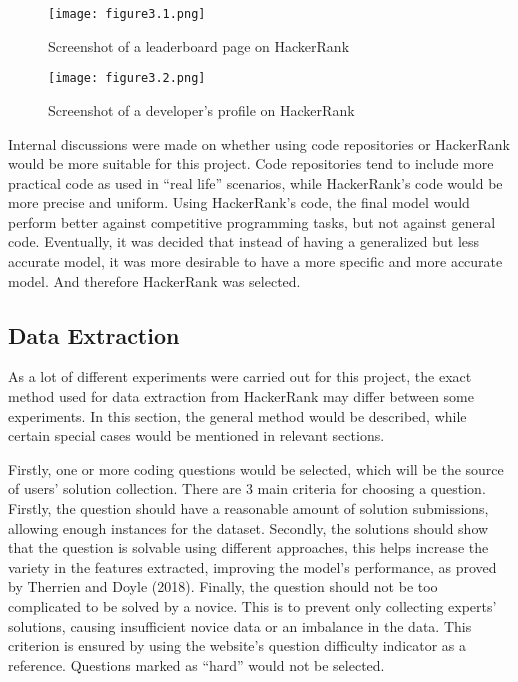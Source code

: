 \documentclass{report}
\begin{document}
\begin{figure}[h!]
\centering
\texttt{[image: figure3.1.png]}
\caption{Screenshot of a leaderboard page on HackerRank}
\end{figure}

\begin{figure}[h!]
\centering
\texttt{[image: figure3.2.png]}
\caption{Screenshot of a developer’s profile on HackerRank}
\end{figure}

Internal discussions were made on whether using code repositories or HackerRank would be more suitable for this project. Code repositories tend to include more practical code as used in “real life” scenarios, while HackerRank’s code would be more precise and uniform. Using HackerRank’s code, the final model would perform better against competitive programming tasks, but not against general code. Eventually, it was decided that instead of having a generalized but less accurate model, it was more desirable to have a more specific and more accurate model. And therefore HackerRank was selected.

\subsection{Data Extraction}

As a lot of different experiments were carried out for this project, the exact method used for data extraction from HackerRank may differ between some experiments. In this section, the general method would be described, while certain special cases would be mentioned in relevant sections.

Firstly, one or more coding questions would be selected, which will be the source of users’ solution collection. There are 3 main criteria for choosing a question. Firstly, the question should have a reasonable amount of solution submissions, allowing enough instances for the dataset. Secondly, the solutions should show that the question is solvable using different approaches, this helps increase the variety in the features extracted, improving the model’s performance, as proved by Therrien and Doyle (2018). Finally, the question should not be too complicated to be solved by a novice. This is to prevent only collecting experts’ solutions, causing insufficient novice data or an imbalance in the data. This criterion is ensured by using the website’s question difficulty indicator as a reference. Questions marked as “hard” would not be selected.
\end{document}
